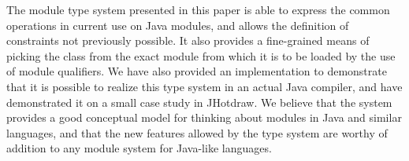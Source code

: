 The module type system presented in this paper is able to express the common operations
in current use on Java modules, and allows the definition of constraints
not previously possible. It also provides a fine-grained
means of picking the class from the exact module from which
it is to be loaded by the use of module qualifiers. We have
also provided an implementation to demonstrate that it is
possible to realize this type system in an actual Java compiler,
and have demonstrated it on a small case study in JHotdraw.
We believe that the system provides a good conceptual
model for thinking about modules in Java and similar languages,
and that the new features allowed by the type system are worthy
of addition to any module system for Java-like languages.